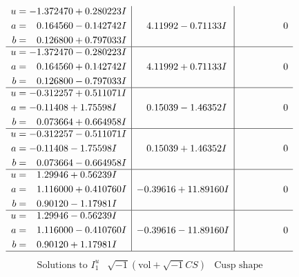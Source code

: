 \documentclass[1p]{elsarticle_modified}
\theoremstyle{definition}
\newcommand{\I}{\sqrt{-1}}
\begin{document}
$$\begin{array}{c|c|c}
\begin{aligned}
u &= -1.372470 + 0.280223 I \\
a &= \phantom{-}0.164560 - 0.142742 I \\
b &= \phantom{-}0.126800 + 0.797033 I\end{aligned}
 & \phantom{-}4.11992 - 0.71133 I & \phantom{-0.000000 } 0 \\ \hline\begin{aligned}
u &= -1.372470 - 0.280223 I \\
a &= \phantom{-}0.164560 + 0.142742 I \\
b &= \phantom{-}0.126800 - 0.797033 I\end{aligned}
 & \phantom{-}4.11992 + 0.71133 I & \phantom{-0.000000 } 0 \\ \hline\begin{aligned}
u &= -0.312257 + 0.511071 I \\
a &= -0.11408 + 1.75598 I \\
b &= \phantom{-}0.073664 + 0.664958 I\end{aligned}
 & \phantom{-}0.15039 - 1.46352 I & \phantom{-0.000000 } 0 \\ \hline\begin{aligned}
u &= -0.312257 - 0.511071 I \\
a &= -0.11408 - 1.75598 I \\
b &= \phantom{-}0.073664 - 0.664958 I\end{aligned}
 & \phantom{-}0.15039 + 1.46352 I & \phantom{-0.000000 } 0 \\ \hline\begin{aligned}
u &= \phantom{-}1.29946 + 0.56239 I \\
a &= \phantom{-}1.116000 + 0.410760 I \\
b &= \phantom{-}0.90120 - 1.17981 I\end{aligned}
 & -0.39616 + 11.89160 I & \phantom{-0.000000 } 0 \\ \hline\begin{aligned}
u &= \phantom{-}1.29946 - 0.56239 I \\
a &= \phantom{-}1.116000 - 0.410760 I \\
b &= \phantom{-}0.90120 + 1.17981 I\end{aligned}
 & -0.39616 - 11.89160 I & \phantom{-0.000000 } 0\\
 \hline 
 \end{array}$$\newpage$$\begin{array}{c|c|c}  
\text{Solutions to }I^u_{1}& \I (\text{vol} + \sqrt{-1}CS) & \text{Cusp shape}\\

\end{array}$$
\end{document}
